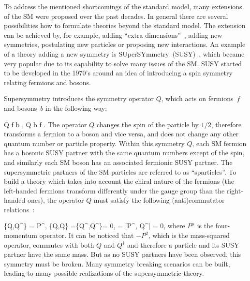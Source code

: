 To address the mentioned shortcomings of the standard model, many extensions of the SM were proposed over the past decades. In general there are several possibilities how to formulate theories beyond the standard model. The extension can be achieved by, for example, adding ``extra dimensions''~\cite{Patrignani:2016xqp}, adding new symmetries, postulating new particles or proposing new interactions. An example of a theory adding a new symmetry is SUperSYmmetry~(SUSY)~\cite{Martin:1997ns}, which became very popular due to its capability to solve many issues of the SM. SUSY started to be developed in the 1970's around an idea of introducing a spin symmetry relating fermions and bosons.
  

Supersymmetry introduces the symmetry operator $Q$, which acts on fermions~$f$ and bosons~$b$ in the following way:

{
Q \mid f \rangle \to \mid b \rangle ,
}
{ 
Q \mid b \rangle \to \mid f \rangle .
}
The operator $Q$ changes the spin of the particle by $1/2$, therefore transforms a fermion to a boson and vice versa, and does not change any other quantum number or particle property. Within this symmetry $Q$, each SM fermion has a bosonic SUSY partner with the same quantum numbers except of the spin, and similarly each SM boson has an associated fermionic SUSY partner. The supersymmetric partners of the SM particles are referred to as ``sparticles''. To build a theory which takes into account the chiral nature of the fermions (the left-handed fermions transform differently under the gauge group than the right-handed ones), the operator $Q$ must satisfy the following (anti)commutator relations~\cite{Haag:1974qh, Coleman:1967ad}:

{
\{Q,Q^{\dagger}\} = P^{\mu}, \; \{Q,Q\} =\{Q^{\dagger},Q^{\dagger}\}= 0, \; [P^{\mu}, Q] = [P^{\mu}, Q^{\dagger}] = 0,
}
where $P^{\mu}$ is the four-momentum operator. It can be noticed that $-P^{2}$, which is the mass-squared operator, commutes with both $Q$ and $Q^{\dagger}$ and therefore a particle and its SUSY partner have the same mass. But as no SUSY partners have been observed, this symmetry must be broken. Many symmetry breaking scenarios can be built, leading to many possible realizations of the supersymmetric theory. 

